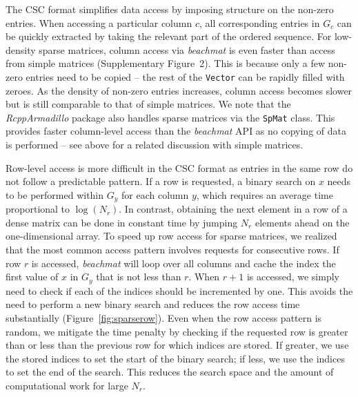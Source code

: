 \documentclass[10pt,letterpaper]{article}
\newcommand{\beachmat}{\textit{beachmat}}
\newcommand{\code}[1]{\texttt{#1}}
\newcommand{\suppfigsparsecol}{2}
\begin{document}

The CSC format simplifies data access by imposing structure on the non-zero entries.
When accessing a particular column $c$, all corresponding entries in $G_c$ can be quickly extracted by taking the relevant part of the ordered sequence.
For low-density sparse matrices, column access via \beachmat{} is even faster than access from simple matrices (Supplementary Figure~\suppfigsparsecol{}).
This is because only a few non-zero entries need to be copied -- the rest of the \code{Vector} can be rapidly filled with zeroes.
As the density of non-zero entries increases, column access becomes slower but is still comparable to that of simple matrices.
We note that the \textit{RcppArmadillo} package \cite{eddelbuettel2014arma} also handles sparse matrices via the \code{SpMat} class.
This provides faster column-level access than the \beachmat{} API as no copying of data is performed -- see above for a related discussion with simple matrices.


Row-level access is more difficult in the CSC format as entries in the same row do not follow a predictable pattern.
If a row is requested, a binary search on $x$ needs to be performed within $G_y$ for each column $y$, which requires an average time proportional to $\log(N_r)$.
In contrast, obtaining the next element in a row of a dense matrix can be done in constant time by jumping $N_r$ elements ahead on the one-dimensional array.
To speed up row access for sparse matrices, we realized that the most common access pattern involves requests for consecutive rows.
If row $r$ is accessed, \beachmat{} will loop over all columns and cache the index the first value of $x$ in $G_y$ that is not less than $r$.
When $r+1$ is accessed, we simply need to check if each of the indices should be incremented by one.
This avoids the need to perform a new binary search and reduces the row access time substantially (Figure~\ref{fig:sparserow}).
Even when the row access pattern is random, we mitigate the time penalty by checking if the requested row is greater than or less than the previous row for which indices are stored.
If greater, we use the stored indices to set the start of the binary search; if less, we use the indices to set the end of the search. 
This reduces the search space and the amount of computational work for large $N_r$.
\end{document}
